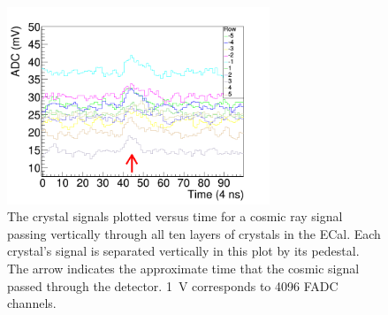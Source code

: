 \begin{figure}[htb]
  \centering
      \includegraphics[width=0.7\textwidth]{pics/performance/cosmicSignal.png}
  \caption[Real cosmic ray signal in raw FADC waveform passing vertically through ECal]{The crystal signals plotted versus time for a cosmic ray signal passing vertically through all ten layers of crystals in the ECal. Each crystal's signal is separated vertically in this plot by its pedestal. The arrow indicates the approximate time that the cosmic signal passed through the detector. 1~V corresponds to 4096 FADC channels.}
  \label{Figure:cosmicSig}
\end{figure}


